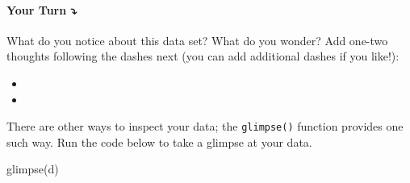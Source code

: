 \documentclass[
]{article}
\newenvironment{Shaded}{\begin{snugshade}}{\end{snugshade}}
\newcommand{\FunctionTok}[1]{\textcolor[rgb]{0.00,0.00,0.00}{#1}}
\newcommand{\NormalTok}[1]{#1}
\providecommand{\tightlist}{%
  \setlength{\itemsep}{0pt}\setlength{\parskip}{0pt}}
\begin{document}
\hypertarget{your-turn}{%
\paragraph{\texorpdfstring{{\textbf{Your Turn}}
\textbf{⤵}}{Your Turn ⤵}}\label{your-turn}}

What do you notice about this data set? What do you wonder? Add one-two
thoughts following the dashes next (you can add additional dashes if you
like!):

\begin{itemize}
\tightlist
\item
\item
\end{itemize}

There are other ways to inspect your data; the \texttt{glimpse()}
function provides one such way. Run the code below to take a glimpse at
your data.

\begin{Shaded}
\begin{Highlighting}[]
\FunctionTok{glimpse}\NormalTok{(d)}
\end{Highlighting}
\end{Shaded}
\end{document}
